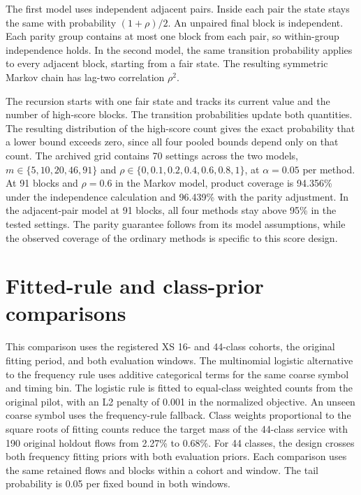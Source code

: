 \documentclass[preprint,11pt]{elsarticle}
\begin{document}
The first model uses independent adjacent pairs. Inside each pair the state stays the same with probability $(1+\rho)/2$. An unpaired final block is independent. Each parity group contains at most one block from each pair, so within-group independence holds. In the second model, the same transition probability applies to every adjacent block, starting from a fair state. The resulting symmetric Markov chain has lag-two correlation $\rho^2$.

The recursion starts with one fair state and tracks its current value and the number of high-score blocks. The transition probabilities update both quantities. The resulting distribution of the high-score count gives the exact probability that a lower bound exceeds zero, since all four pooled bounds depend only on that count. The archived grid contains 70 settings across the two models, $m\in\{5,10,20,46,91\}$ and $\rho\in\{0,0.1,0.2,0.4,0.6,0.8,1\}$, at $\alpha=0.05$ per method. At 91 blocks and $\rho=0.6$ in the Markov model, product coverage is 94.356\% under the independence calculation and 96.439\% with the parity adjustment. In the adjacent-pair model at 91 blocks, all four methods stay above 95\% in the tested settings. The parity guarantee follows from its model assumptions, while the observed coverage of the ordinary methods is specific to this score design.

\FloatBarrier

\section{Fitted-rule and class-prior comparisons}
\label{sec:xs-sensitivity}

This comparison uses the registered XS 16- and 44-class cohorts, the original fitting period, and both evaluation windows. The multinomial logistic alternative to the frequency rule uses additive categorical terms for the same coarse symbol and timing bin. The logistic rule is fitted to equal-class weighted counts from the original pilot, with an L2 penalty of 0.001 in the normalized objective. An unseen coarse symbol uses the frequency-rule fallback. Class weights proportional to the square roots of fitting counts reduce the target mass of the 44-class service with 190 original holdout flows from 2.27\% to 0.68\%. For 44 classes, the design crosses both frequency fitting priors with both evaluation priors. Each comparison uses the same retained flows and blocks within a cohort and window. The tail probability is 0.05 per fixed bound in both windows.
\end{document}
